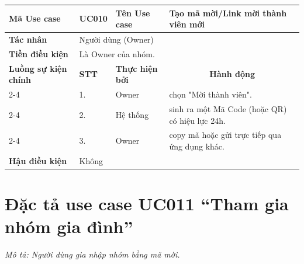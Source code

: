 \begin{longtable}{|p{2.7cm}|p{0.8cm}|p{2.6cm}|p{7.3cm}|}
\hline
\cellcolor[HTML]{D5F5E3}\textbf{Mã Use case} & \multicolumn{1}{l|}{UC010} & \cellcolor[HTML]{D5F5E3}\textbf{Tên Use case} & Tạo mã mời/Link mời thành viên mới \\ \hline
\cellcolor[HTML]{D5F5E3}\textbf{Tác nhân} & \multicolumn{3}{p{10.7cm}|}{Người dùng (Owner)} \\ \hline
\cellcolor[HTML]{D5F5E3}\textbf{Tiền điều kiện} & \multicolumn{3}{p{10.7cm}|}{Là Owner của nhóm.} \\ \hline

\cellcolor[HTML]{D5F5E3}\textbf{Luồng sự kiện chính} & \cellcolor[HTML]{FDEBD0}\textbf{STT} & \cellcolor[HTML]{FDEBD0}\textbf{Thực hiện bởi} & \multicolumn{1}{c|}{\cellcolor[HTML]{FDEBD0}\textbf{Hành động}} \\ \cline{2-4} 
\cellcolor[HTML]{D5F5E3} & 1. & Owner & chọn "Mời thành viên". \\ \cline{2-4} 
\cellcolor[HTML]{D5F5E3} & 2. & Hệ thống & sinh ra một Mã Code (hoặc QR) có hiệu lực 24h. \\ \cline{2-4} 
\cellcolor[HTML]{D5F5E3} & 3. & Owner & copy mã hoặc gửi trực tiếp qua ứng dụng khác. \\ \hline

\cellcolor[HTML]{D5F5E3}\textbf{Hậu điều kiện} & \multicolumn{3}{p{10.7cm}|}{Không} \\ \hline
\end{longtable}
\endgroup

\section{Đặc tả use case UC011 ``Tham gia nhóm gia đình''}
\textit{Mô tả: Người dùng gia nhập nhóm bằng mã mời.}
\vspace{0.5cm}

\begingroup
\renewcommand{\arraystretch}{1.5}

